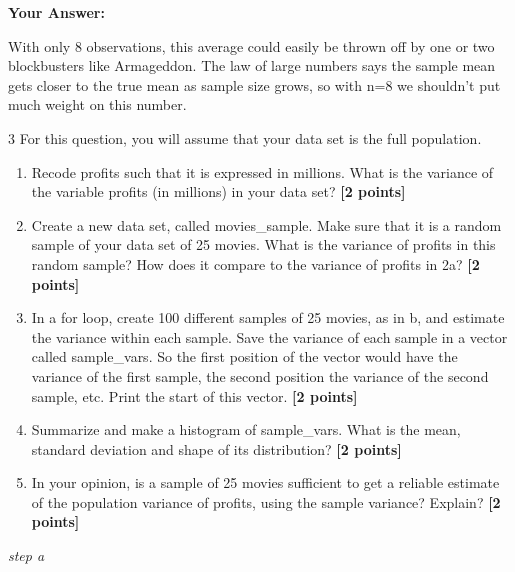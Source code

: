 \documentclass[
]{article}
\newenvironment{Shaded}{\begin{snugshade}}{\end{snugshade}}
\newcommand{\DecValTok}[1]{\textcolor[rgb]{0.00,0.00,0.81}{#1}}
\newcommand{\FunctionTok}[1]{\textcolor[rgb]{0.13,0.29,0.53}{\textbf{#1}}}
\newcommand{\NormalTok}[1]{#1}
\newcommand{\OtherTok}[1]{\textcolor[rgb]{0.56,0.35,0.01}{#1}}
\newcommand{\SpecialCharTok}[1]{\textcolor[rgb]{0.81,0.36,0.00}{\textbf{#1}}}
\providecommand{\tightlist}{%
  \setlength{\itemsep}{0pt}\setlength{\parskip}{0pt}}
\begin{document}
\textbf{Your Answer:}

With only 8 observations, this average could easily be thrown off by one
or two blockbusters like Armageddon. The law of large numbers says the
sample mean gets closer to the true mean as sample size grows, so with
n=8 we shouldn't put much weight on this number.

3 For this question, you will assume that your data set is the full
population.

\begin{enumerate}
\def\labelenumi{\alph{enumi}.}
\tightlist
\item
  Recode profits such that it is expressed in millions. What is the
  variance of the variable profits (in millions) in your data set?
  \textbf{[2 points]}
\item
  Create a new data set, called movies\_sample. Make sure that it is a
  random sample of your data set of 25 movies. What is the variance of
  profits in this random sample? How does it compare to the variance of
  profits in 2a? \textbf{[2 points]}
\item
  In a for loop, create 100 different samples of 25 movies, as in b, and
  estimate the variance within each sample. Save the variance of each
  sample in a vector called sample\_vars. So the first position of the
  vector would have the variance of the first sample, the second
  position the variance of the second sample, etc. Print the start of
  this vector. \textbf{[2 points]}
\item
  Summarize and make a histogram of sample\_vars. What is the mean,
  standard deviation and shape of its distribution? \textbf{[2 points]}
\item
  In your opinion, is a sample of 25 movies sufficient to get a reliable
  estimate of the population variance of profits, using the sample
  variance? Explain? \textbf{[2 points]}
\end{enumerate}

\emph{step a}

\begin{Shaded}
\end{Shaded}
\end{document}
